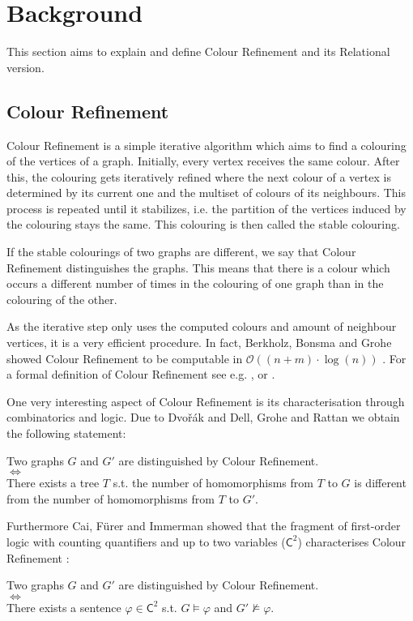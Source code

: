 \documentclass[a4paper,11pt,DIV=15]{scrartcl} %
\theoremstyle{plain}
\theoremstyle{definition}
\begin{document}
\section{Background}

This section aims to explain and define Colour Refinement and its Relational version.

\subsection{Colour Refinement} \label{sec::CR}

Colour Refinement is a simple iterative algorithm which aims to find a colouring of the vertices of a graph.
Initially, every vertex receives the same colour. 
After this, the colouring gets iteratively refined where the next colour of a vertex is determined by its current one and the multiset of colours of its neighbours.
This process is repeated until it stabilizes, i.e. the partition of the vertices induced by the colouring stays the same. This colouring is then called the stable colouring.

If the stable colourings of two graphs are different, we say that Colour Refinement distinguishes the graphs.
This means that there is a colour which occurs a different number of times in the colouring of one graph than in the colouring of the other.

As the iterative step only uses the computed colours and amount of neighbour vertices, it is a very efficient procedure.
In fact, Berkholz, Bonsma and Grohe showed Colour Refinement to be computable in $\mathcal O((n+m)\cdot\log (n))$ \cite{berkholz2017TightLower}.
For a formal definition of Colour Refinement see e.g. \cite{kiefer2020power}, \cite{scheidt2024color} or \cite{grohe2021color}.

One very interesting aspect of Colour Refinement is its characterisation through combinatorics and logic.
Due to Dvo\v r\'ak \cite{dvovrak2010recognizing} and Dell, Grohe and Rattan \cite{dell2018LovaszMeets} we obtain the following statement:
\begin{center}
	Two graphs $G$ and $G'$ are distinguished by Colour Refinement.
	\\ $\Longleftrightarrow$ \\ 
	There exists a tree $T$ s.t. the number of homomorphisms from $T$ to $G$ is different from the number of homomorphisms from $T$ to $G'$.
\end{center}
Furthermore Cai, Fürer and Immerman showed that the fragment of first-order logic with counting quantifiers and up to two variables ($\mathsf C^2$) characterises Colour Refinement \cite{cai1992optimal}:
\begin{center}
	Two graphs $G$ and $G'$ are distinguished by Colour Refinement.
	\\ $\Longleftrightarrow$ \\ 
	There exists a sentence $\varphi\in \mathsf C^2$ s.t. $G\models \varphi$ and $G'\not\models\varphi$.
\end{center}
\end{document}
